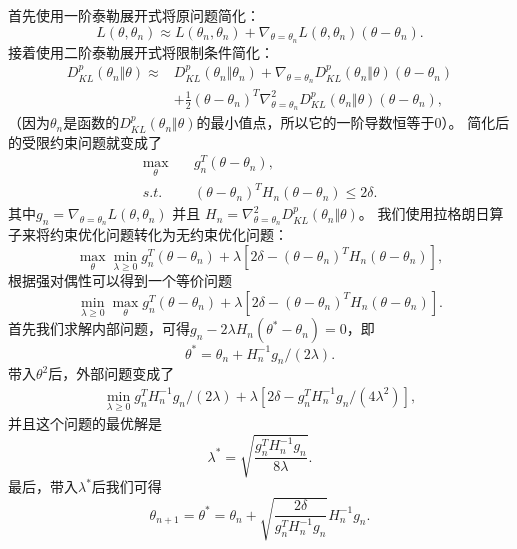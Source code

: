 首先使用一阶泰勒展开式将原问题简化：
\begin{equation}
    L(\theta, \theta_n) \approx L(\theta_n, \theta_n) + \nabla_{\theta=\theta_n} L(\theta, \theta_n) (\theta - \theta_n).
\end{equation}
接着使用二阶泰勒展开式将限制条件简化：
\begin{equation}
    \begin{aligned}
    D^{p}_{KL}(\theta_n \Vert \theta) \approx& D^{p}_{KL}(\theta_n \Vert \theta_n) + \nabla_{\theta=\theta_n} D^{p}_{KL}(\theta_n \Vert \theta) (\theta - \theta_n) \\
    & + \frac{1}{2} (\theta - \theta_n)^T \nabla^2_{\theta=\theta_n} D^{p}_{KL}(\theta_n \Vert \theta) (\theta - \theta_n),
    \end{aligned}
\end{equation}
（因为$\theta_n$是函数的$D^{p}_{KL}(\theta_n \Vert \theta)$的最小值点，所以它的一阶导数恒等于0）。
简化后的受限约束问题就变成了
\begin{equation}
    \begin{aligned}
    \max_{\theta}&\quad g^T_n (\theta - \theta_n),\\
    s.t.&\quad (\theta - \theta_n)^T H_n (\theta - \theta_n) \le 2 \delta.
    \end{aligned}
\end{equation}
其中$g_n = \nabla_{\theta=\theta_n} L(\theta, \theta_n)$ 并且 $H_n = \nabla^2_{\theta=\theta_n} D^{p}_{KL}(\theta_n \Vert \theta)$。
我们使用拉格朗日算子来将约束优化问题转化为无约束优化问题：
\begin{equation}
    \max_{\theta}\min_{\lambda \ge 0} g^T_n(\theta - \theta_n) + \lambda[2\delta - (\theta - \theta_n)^T H_n (\theta - \theta_n)],
\end{equation}
根据强对偶性可以得到一个等价问题
\begin{equation}
    \min_{\lambda \ge 0}\max_{\theta} g^T_n(\theta - \theta_n) + \lambda[2\delta - (\theta - \theta_n)^T H_n (\theta - \theta_n)].
\end{equation}
首先我们求解内部问题，可得$g_n - 2 \lambda H_n(\theta^* - \theta_n) = 0$，即
\begin{equation}
    \theta^* = \theta_n + H^{-1}_n g_n /(2\lambda).
\end{equation}
带入$\theta^2$后，外部问题变成了
\begin{eqnarray}
    \min_{\lambda \ge 0} g^T_n H_n^{-1} g_n / (2 \lambda) + \lambda[2\delta - g^T_n H^{-1}_n g_n/(4\lambda^2)],
\end{eqnarray}
并且这个问题的最优解是
\begin{equation}
    \lambda^* = \sqrt{\frac{g^T_n H^{-1}_n g_n}{8\lambda}}.
\end{equation}
最后，带入$\lambda^*$后我们可得
\begin{equation}
    \theta_{n+1} = \theta^* = \theta_n + \sqrt{\frac{2\delta}{g^T_n H^{-1}_n g_n}} H^{-1}_n g_n.
\end{equation}

